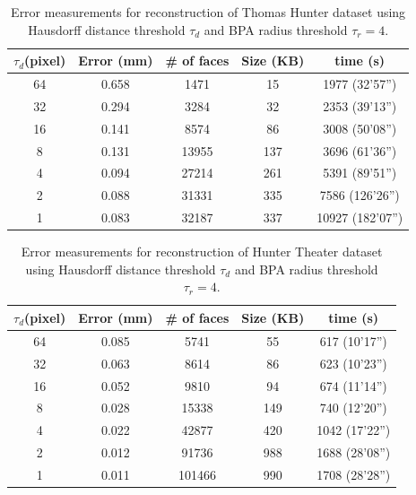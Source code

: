 \setlength{\tabcolsep}{4pt}
\begin{table}[hbtp]
\begin{center}
\begin{tabular}[t]{||c||c|c|c|c||}
\hline
$\tau_{d} $(pixel) & Error (mm)& \# of faces & Size (KB) & time (s) \\ \hline \hline
64 & 0.658 & 1471  & 15  & 1977  (32'57'') \\ \hline 
32 & 0.294 & 3284  & 32  & 2353  (39'13'') \\ \hline
16 & 0.141 & 8574  & 86  & 3008  (50'08'') \\ \hline
8  & 0.131 & 13955 & 137 & 3696  (61'36'') \\ \hline
4  & 0.094 & 27214 & 261 & 5391  (89'51'') \\ \hline
2  & 0.088 & 31331 & 335 & 7586  (126'26'')\\ \hline
1  & 0.083 & 32187 & 337 & 10927 (182'07'')\\ \hline
\end{tabular}
\end{center}
\caption{Error measurements for reconstruction of Thomas Hunter dataset using
Hausdorff distance threshold $\tau_d$ and BPA radius threshold $\tau_r = 4$.}
\label{tbl:em}
\end{table}
\setlength{\tabcolsep}{1.4pt}


\setlength{\tabcolsep}{4pt}
\begin{table}[hbtp]
\begin{center}
\begin{tabular}[t]{||c||c|c|c|c||}
\hline
$\tau_{d} $(pixel) & Error (mm)& \# of faces & Size (KB) & time (s) \\ \hline \hline
64 & 0.085 & 5741   & 55  & 617  (10'17'') \\ \hline
32 & 0.063 & 8614   & 86  & 623  (10'23'') \\ \hline  %
16 & 0.052 & 9810   & 94  & 674  (11'14'') \\ \hline
8  & 0.028 & 15338  & 149 & 740  (12'20'') \\ \hline
4  & 0.022 & 42877  & 420 & 1042 (17'22'') \\ \hline
2  & 0.012 & 91736  & 988 & 1688 (28'08'') \\ \hline %
1  & 0.011 & 101466 & 990 & 1708 (28'28'') \\ \hline
\end{tabular}
\end{center}
\caption{Error measurements for reconstruction of Hunter Theater dataset using
Hausdorff distance threshold $\tau_d$ and BPA radius threshold $\tau_r = 4$.}
\label{tbl:em_theater}
\end{table}
\setlength{\tabcolsep}{1.4pt}

